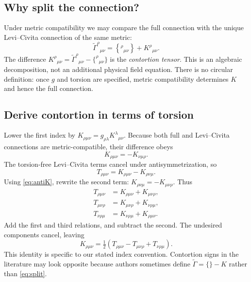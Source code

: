 \documentclass[11pt,a4paper]{article}
\begin{document}
\subsection{Why split the connection?}
Under metric compatibility we may compare the full connection with the unique Levi--Civita connection of the same metric:
\begin{equation}\label{eq:split}
\boxed{\widetilde\Gamma^\rho{}_{\mu\nu}=\left\{^\rho{}_{\mu\nu}\right\}+K^\rho{}_{\mu\nu}.}
\end{equation}
The difference $K^\rho{}_{\mu\nu}=\widetilde\Gamma^\rho{}_{\mu\nu}-\{^\rho{}_{\mu\nu}\}$ is the \emph{contortion tensor}. This is an algebraic decomposition, not an additional physical field equation. There is no circular definition: once $g$ and torsion are specified, metric compatibility determines $K$ and hence the full connection.

\subsection{Derive contortion in terms of torsion}
Lower the first index by $K_{\rho\mu\nu}=g_{\rho\lambda}K^\lambda{}_{\mu\nu}$. Because both full and Levi--Civita connections are metric-compatible, their difference obeys
\begin{equation}\label{eq:antiK}
K_{\rho\mu\nu}=-K_{\nu\mu\rho}.
\end{equation}
The torsion-free Levi--Civita terms cancel under antisymmetrization, so
\begin{equation}
T_{\rho\mu\nu}=K_{\rho\mu\nu}-K_{\rho\nu\mu}.
\end{equation}
Using \eqref{eq:antiK}, rewrite the second term: $K_{\rho\nu\mu}=-K_{\mu\nu\rho}$. Thus
\begin{align*}
T_{\rho\mu\nu}&=K_{\rho\mu\nu}+K_{\mu\nu\rho},\\
T_{\mu\nu\rho}&=K_{\mu\nu\rho}+K_{\nu\rho\mu},\\
T_{\nu\rho\mu}&=K_{\nu\rho\mu}+K_{\rho\mu\nu}.
\end{align*}
Add the first and third relations, and subtract the second. The undesired components cancel, leaving
\begin{equation}\label{eq:contortion}
\boxed{K_{\rho\mu\nu}=\tfrac12\left(T_{\rho\mu\nu}-T_{\mu\nu\rho}+T_{\nu\rho\mu}\right).}
\end{equation}
This identity is specific to our stated index convention. Contortion signs in the literature may look opposite because authors sometimes define $\widetilde\Gamma=\{\}-K$ rather than \eqref{eq:split}.
\end{document}
